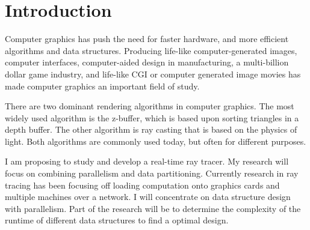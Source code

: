 \section{ Introduction }

Computer graphics has push the need for faster hardware,  and more efficient algorithms and data structures.  Producing life-like computer-generated images, computer interfaces, computer-aided design in manufacturing, a multi-billion dollar game industry, and life-like CGI or computer generated image movies\cite{gaming:2007} has made computer graphics an important field of study.

There are two dominant rendering algorithms in computer graphics.  The most widely used algorithm is the z-buffer, which is based upon sorting triangles in a depth buffer.  The other algorithm is ray casting that is based on the physics of light.  Both algorithms are commonly used today, but often for different purposes.

I am proposing to study and develop a real-time ray tracer.  My research will focus on combining parallelism and data partitioning.  Currently research in ray tracing has been focusing off loading computation onto graphics cards and multiple machines over a network.  I will concentrate on data structure design with parallelism.  Part of the research will be to determine the complexity of the runtime of different data structures to find a optimal design.

   